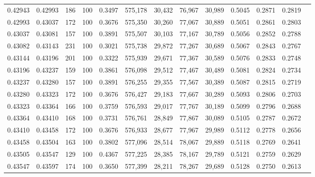 \begin{tabular}{rrrrrrrrrrrrr}
0.42943 & 0.42993 &   186 & 100 &                                     0.3497 & 575,178 &  30,432 &  76,967 &  30,989 & 0.5045 & 0.2871 & 0.2819 \\
0.42993 & 0.43037 &   172 & 100 &                                     0.3676 & 575,350 &  30,260 &  77,067 &  30,889 & 0.5051 & 0.2861 & 0.2803 \\
0.43037 & 0.43081 &   157 & 100 &                                     0.3891 & 575,507 &  30,103 &  77,167 &  30,789 & 0.5056 & 0.2852 & 0.2788 \\
0.43082 & 0.43143 &   231 & 100 &                                     0.3021 & 575,738 &  29,872 &  77,267 &  30,689 & 0.5067 & 0.2843 & 0.2767 \\
0.43144 & 0.43196 &   201 & 100 &                                     0.3322 & 575,939 &  29,671 &  77,367 &  30,589 & 0.5076 & 0.2833 & 0.2748 \\
0.43196 & 0.43237 &   159 & 100 &                                     0.3861 & 576,098 &  29,512 &  77,467 &  30,489 & 0.5081 & 0.2824 & 0.2734 \\
0.43237 & 0.43280 &   157 & 100 &                                     0.3891 & 576,255 &  29,355 &  77,567 &  30,389 & 0.5087 & 0.2815 & 0.2719 \\
0.43280 & 0.43323 &   172 & 100 &                                     0.3676 & 576,427 &  29,183 &  77,667 &  30,289 & 0.5093 & 0.2806 & 0.2703 \\
0.43323 & 0.43364 &   166 & 100 &                                     0.3759 & 576,593 &  29,017 &  77,767 &  30,189 & 0.5099 & 0.2796 & 0.2688 \\
0.43364 & 0.43410 &   168 & 100 &                                     0.3731 & 576,761 &  28,849 &  77,867 &  30,089 & 0.5105 & 0.2787 & 0.2672 \\
0.43410 & 0.43458 &   172 & 100 &                                     0.3676 & 576,933 &  28,677 &  77,967 &  29,989 & 0.5112 & 0.2778 & 0.2656 \\
0.43458 & 0.43504 &   163 & 100 &                                     0.3802 & 577,096 &  28,514 &  78,067 &  29,889 & 0.5118 & 0.2769 & 0.2641 \\
0.43505 & 0.43547 &   129 & 100 &                                     0.4367 & 577,225 &  28,385 &  78,167 &  29,789 & 0.5121 & 0.2759 & 0.2629 \\
0.43547 & 0.43597 &   174 & 100 &                                     0.3650 & 577,399 &  28,211 &  78,267 &  29,689 & 0.5128 & 0.2750 & 0.2613 \\

\end{tabular}
